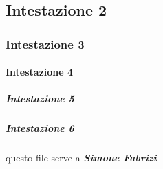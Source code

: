 \subsection*{Intestazione 2}

\subsubsection*{Intestazione 3}

\paragraph*{Intestazione 4}

\subparagraph*{Intestazione 5}

\subparagraph*{Intestazione 6}

questo file serve a {\itshape {\bfseries Simone Fabrizi}} 